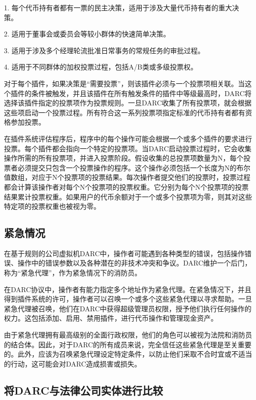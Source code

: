 \documentclass[main.tex]{subfiles}
\begin{document}
1. 每个代币持有者都有一票的民主决策，适用于涉及大量代币持有者的重大决策。

2. 适用于董事会或委员会等较小群体的快速简单决策。

3. 适用于涉及多个经理轮流批准日常事务的常规任务的审批过程。

4. 适用于不同群体的加权投票过程，包括A/B类或多级投票权。

对于每个插件，如果决策是“需要投票”，则该插件必须与一个投票项相关联。当这个插件的条件被触发，并且该插件在所有触发条件的插件中等级最高时，DARC将选择该插件指定的投票项作为投票规则。一旦DARC收集了所有投票项，就会根据这些项启动一个投票过程。所有符合这一系列投票项指定标准的代币持有者都有资格参加投票。

在插件系统评估程序后，程序中的每个操作可能会根据一个或多个插件的要求进行投票。每个插件都会指向一个特定的投票项。当DARC启动投票过程时，它会收集操作所需的所有投票项，并进入投票阶段。假设收集的总投票项数量为N，每个投票者必须提交只包含一个投票操作的程序。这个操作必须包括一个长度为N的布尔值数组，对应于N个投票项的投票结果。每次操作者提交他们的投票时，投票过程都会计算该操作者对每个N个投票项的投票权重。它分别为每个N个投票项的投票结果累计投票权重。如果用户的代币余额对于一个或多个投票项为零，则其对这些特定项的投票权重也被视为零。

\subsection{紧急情况}

在基于规则的公司虚拟机DARC中，操作者可能遇到各种类型的错误，包括操作错误、操作中的错误参数以及各种潜在的非技术冲突和争议。DARC维护一个后门，称为“紧急代理”，作为紧急情况下的消防员。

在DARC协议中，操作者有能力指定多个地址作为紧急代理。在紧急情况下，并且得到插件系统的许可，操作者可以召唤一个或多个这些紧急代理以寻求帮助。一旦紧急代理被召唤，他们在DARC中获得超级管理员权限，授予他们执行任何操作的权力。这包括添加、启用、禁用插件，进行代币操作和管理现金资产。

由于紧急代理拥有最高级别的全面行政权限，他们的角色可以被视为法院和消防员的结合体。因此，对于DARC的所有成员来说，完全信任这些紧急代理是至关重要的。此外，应该为召唤紧急代理设定特定条件，以防止他们采取不合时宜或不适当的行动，这可能会对DARC造成损害或损失。

\subsection{将DARC与法律公司实体进行比较}
\end{document}
